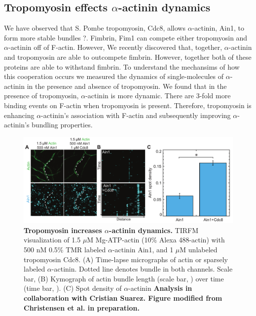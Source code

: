 \subsection{Tropomyosin effects \texorpdfstring{$\alpha$}{a}-actinin dynamics}
We have observed that S. Pombe tropomyosin, Cdc8, allows $\alpha$-actinin, Ain1, to form more stable bundles \citep{christensen_competition_2017}?. Fimbrin, Fim1 can compete either tropomyosin and $\alpha$-actinin off of F-actin. However, We recently discovered that, together, $\alpha$-actinin and tropomyosin are able to outcompete fimbrin. However, together both of these proteins are able to withstand fimbrin. To understand the mechansims of how this cooperation occurs we measured the dynamics of single-molecules of $\alpha$-actinin in the presence and absence of tropomyosin. We found that in the presence of tropomyosin, $\alpha$-actinin is more dynamic. There are 3-fold more binding events on F-actin when tropomyosin is present. Therefore, tropomyosin is enhancing $\alpha$-actinin's association with F-actin and subsequently improving $\alpha$-actinin's bundling properties. 


\begin{figure}
\centering
\includegraphics[width=\textwidth]{img/ch03/Thesis_aact_dynamics.pdf}
\caption[Tropomyosin increases \texorpdfstring{$\alpha$}{alpha}-actinin dynamics.]{\textbf{Tropomyosin increases $\alpha$-actinin dynamics.} TIRFM visualization of 1.5 $\mu$M Mg-ATP-actin (10\% Alexa 488-actin) with 500 nM 0.5\% TMR labeled $\alpha$-actinin Ain1, and 1 $\mu$M unlabeled tropomyosin Cdc8. (A) Time-lapse micrographs of actin or sparsely labeled $\alpha$-actinin. Dotted line denotes bundle in both channels. Scale bar, (B) Kymograph of actin bundle length (scale bar, ) over time (time bar, ). (C) Spot density of $\alpha$-actinin \textbf{Analysis in collaboration with Cristian Suarez. Figure modified from Christensen et al. in preparation.}}
\label{fig:tropo_aact}
\end{figure}


